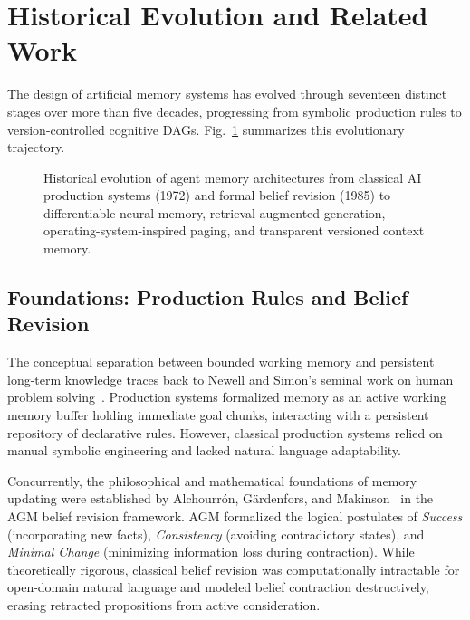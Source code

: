 \section{Historical Evolution and Related Work}
\label{sec:history_and_related_work}

The design of artificial memory systems has evolved through seventeen distinct stages over more than five decades, progressing from symbolic production rules to version-controlled cognitive DAGs. Fig.~\ref{fig:history_timeline} summarizes this evolutionary trajectory.

\begin{figure}[t]
\centering

\caption{Historical evolution of agent memory architectures from classical AI production systems (1972) and formal belief revision (1985) to differentiable neural memory, retrieval-augmented generation, operating-system-inspired paging, and transparent versioned context memory.}
\label{fig:history_timeline}
\end{figure}

\subsection{Foundations: Production Rules and Belief Revision}
The conceptual separation between bounded working memory and persistent long-term knowledge traces back to Newell and Simon's seminal work on human problem solving~\cite{newell1972human}. Production systems formalized memory as an active working memory buffer holding immediate goal chunks, interacting with a persistent repository of declarative rules. However, classical production systems relied on manual symbolic engineering and lacked natural language adaptability.

Concurrently, the philosophical and mathematical foundations of memory updating were established by Alchourr{\'o}n, G{\"a}rdenfors, and Makinson~\cite{agm1985logic} in the AGM belief revision framework. AGM formalized the logical postulates of \textit{Success} (incorporating new facts), \textit{Consistency} (avoiding contradictory states), and \textit{Minimal Change} (minimizing information loss during contraction). While theoretically rigorous, classical belief revision was computationally intractable for open-domain natural language and modeled belief contraction destructively, erasing retracted propositions from active consideration.

